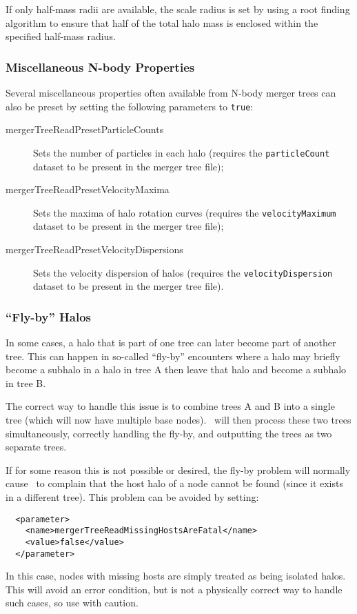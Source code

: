 If only half-mass radii are available, the scale radius is set by using a root finding algorithm to ensure that half of the total halo mass is enclosed within the specified half-mass radius.

\subsubsection{Miscellaneous N-body Properties}

Several miscellaneous properties often available from N-body merger trees can also be preset by setting the following parameters to {\tt true}:
\begin{description}
\item[{mergerTreeReadPresetParticleCounts}] Sets the number of particles in each halo (requires the {\tt particleCount} dataset to be present in the merger tree file);
\item[{mergerTreeReadPresetVelocityMaxima}] Sets the maxima of halo rotation curves (requires the {\tt velocityMaximum} dataset to be present in the merger tree file);
\item[{mergerTreeReadPresetVelocityDispersions}] Sets the velocity dispersion of halos (requires the {\tt velocityDispersion} dataset to be present in the merger tree file).
\end{description}

\subsubsection{``Fly-by'' Halos}

In some cases, a halo that is part of one tree can later become part of another tree. This can happen in so-called ``fly-by'' encounters where a halo may briefly become a subhalo in a halo in tree A then leave that halo and become a subhalo in tree B.

The correct way to handle this issue is to combine trees A and B into a single tree (which will now have multiple base nodes). \glc\ will then process these two trees simultaneously, correctly handling the fly-by, and outputting the trees as two separate trees.

If for some reason this is not possible or desired, the fly-by problem will normally cause \glc\ to complain that the host halo of a node cannot be found (since it exists in a different tree). This problem can be avoided by setting:
\begin{verbatim}
  <parameter>
    <name>mergerTreeReadMissingHostsAreFatal</name>
    <value>false</value>
  </parameter>
\end{verbatim}
In this case, nodes with missing hosts are simply treated as being isolated halos. This will avoid an error condition, but is not a physically correct way to handle such cases, so use with caution.

